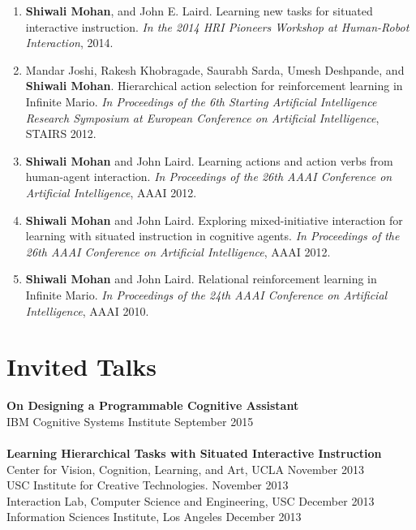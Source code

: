 \documentclass[margin,line,11pt]{res}
\begin{document}
\begin{resume}
\begin{enumerate}[label=\lbrack A\arabic*\rbrack,leftmargin=*]
                  \item \textbf{Shiwali Mohan}, and John E. Laird. Learning new tasks for situated interactive instruction. \emph{In the 2014 HRI Pioneers Workshop at Human-Robot Interaction}, 2014.

                  \item Mandar Joshi, Rakesh Khobragade, Saurabh Sarda, Umesh Deshpande, and \textbf{Shiwali Mohan}. Hierarchical
                    action selection for reinforcement learning in Infinite Mario. \emph{In Proceedings of the 6th Starting Artificial
                      Intelligence Research Symposium at European Conference on Artificial Intelligence}, STAIRS 2012.

                  \item \textbf{Shiwali Mohan} and John Laird. Learning actions and action verbs from human-agent interaction. \emph{In
                    Proceedings of the 26th AAAI Conference on Artificial Intelligence}, AAAI 2012.

                  \item \textbf{Shiwali Mohan} and John Laird. Exploring mixed-initiative interaction for learning with situated instruction in cognitive agents. \emph{In Proceedings of the 26th AAAI Conference on Artificial Intelligence}, AAAI 2012.

                  \item \textbf{Shiwali Mohan} and John Laird. Relational reinforcement learning in Infinite Mario. \emph{In Proceedings of the
                    24th AAAI Conference on Artificial Intelligence}, AAAI 2010.
                  \end{enumerate}

                  \section{\sc Invited Talks}
                  \textbf{On Designing a Programmable Cognitive Assistant}\\
                  IBM Cognitive Systems Institute \hfill September 2015 \\
                  \\
                  \textbf{Learning Hierarchical Tasks with Situated Interactive Instruction}\\
                  Center for Vision, Cognition, Learning, and Art, UCLA \hfill November 2013\\
                  USC Institute for Creative Technologies. \hfill November 2013\\
                  Interaction Lab, Computer Science and Engineering, USC \hfill December 2013\\
                  Information Sciences Institute, Los Angeles \hfill December 2013


\end{resume}
\end{document}
